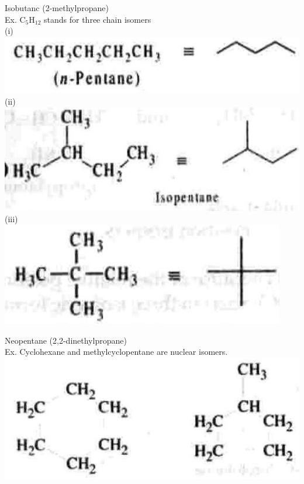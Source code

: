 \documentclass[10pt]{article}
\begin{document}
Isobutanc (2-methylpropane)\\
Ex. $\mathrm{C}_{5} \mathrm{H}_{12}$ stands for three chain isomers\\
(i)\\
\includegraphics[max width=\textwidth, center]{2025_01_28_8470952b98110cec3aabg-039(10)}\\
(ii)\\
\includegraphics[max width=\textwidth, center]{2025_01_28_8470952b98110cec3aabg-039(2)}\\
(iii)\\
\includegraphics[max width=\textwidth, center]{2025_01_28_8470952b98110cec3aabg-039(5)}

Neopentane (2,2-dinethylpropane)\\
Ex. Cyclohexane and methylcyclopentane are nuclear isomers.\\
\includegraphics[max width=\textwidth, center]{2025_01_28_8470952b98110cec3aabg-039(4)}
\end{document}

